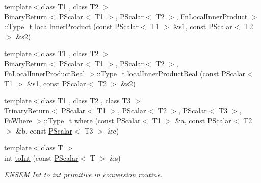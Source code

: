 \begin{DoxyCompactItemize}
\item 
{\footnotesize template$<$class T1 , class T2 $>$ }\\\mbox{\hyperlink{structENSEM_1_1BinaryReturn}{Binary\+Return}}$<$ \mbox{\hyperlink{classENSEM_1_1PScalar}{P\+Scalar}}$<$ T1 $>$, \mbox{\hyperlink{classENSEM_1_1PScalar}{P\+Scalar}}$<$ T2 $>$, \mbox{\hyperlink{structENSEM_1_1FnLocalInnerProduct}{Fn\+Local\+Inner\+Product}} $>$\+::Type\+\_\+t \mbox{\hyperlink{group__primscalar_ga1190a8f3bd7590e615a59825ca33f2b6}{local\+Inner\+Product}} (const \mbox{\hyperlink{classENSEM_1_1PScalar}{P\+Scalar}}$<$ T1 $>$ \&s1, const \mbox{\hyperlink{classENSEM_1_1PScalar}{P\+Scalar}}$<$ T2 $>$ \&s2)
\item 
{\footnotesize template$<$class T1 , class T2 $>$ }\\\mbox{\hyperlink{structENSEM_1_1BinaryReturn}{Binary\+Return}}$<$ \mbox{\hyperlink{classENSEM_1_1PScalar}{P\+Scalar}}$<$ T1 $>$, \mbox{\hyperlink{classENSEM_1_1PScalar}{P\+Scalar}}$<$ T2 $>$, \mbox{\hyperlink{structENSEM_1_1FnLocalInnerProductReal}{Fn\+Local\+Inner\+Product\+Real}} $>$\+::Type\+\_\+t \mbox{\hyperlink{group__primscalar_ga014c96c783c136201ede1f2669b6d18b}{local\+Inner\+Product\+Real}} (const \mbox{\hyperlink{classENSEM_1_1PScalar}{P\+Scalar}}$<$ T1 $>$ \&s1, const \mbox{\hyperlink{classENSEM_1_1PScalar}{P\+Scalar}}$<$ T2 $>$ \&s2)
\item 
{\footnotesize template$<$class T1 , class T2 , class T3 $>$ }\\\mbox{\hyperlink{structENSEM_1_1TrinaryReturn}{Trinary\+Return}}$<$ \mbox{\hyperlink{classENSEM_1_1PScalar}{P\+Scalar}}$<$ T1 $>$, \mbox{\hyperlink{classENSEM_1_1PScalar}{P\+Scalar}}$<$ T2 $>$, \mbox{\hyperlink{classENSEM_1_1PScalar}{P\+Scalar}}$<$ T3 $>$, \mbox{\hyperlink{structENSEM_1_1FnWhere}{Fn\+Where}} $>$\+::Type\+\_\+t \mbox{\hyperlink{group__primscalar_ga2696f074fb7cc4b547788bbf78867d23}{where}} (const \mbox{\hyperlink{classENSEM_1_1PScalar}{P\+Scalar}}$<$ T1 $>$ \&a, const \mbox{\hyperlink{classENSEM_1_1PScalar}{P\+Scalar}}$<$ T2 $>$ \&b, const \mbox{\hyperlink{classENSEM_1_1PScalar}{P\+Scalar}}$<$ T3 $>$ \&c)
\item 
{\footnotesize template$<$class T $>$ }\\int \mbox{\hyperlink{group__primscalar_ga5ec99dbe9e18daf372190e5c3b1a00fa}{to\+Int}} (const \mbox{\hyperlink{classENSEM_1_1PScalar}{P\+Scalar}}$<$ T $>$ \&s)
\begin{DoxyCompactList}\small\item\em \mbox{\hyperlink{namespaceENSEM}{E\+N\+S\+EM}} Int to int primitive in conversion routine. \end{DoxyCompactList}\item 

\end{DoxyCompactItemize}
